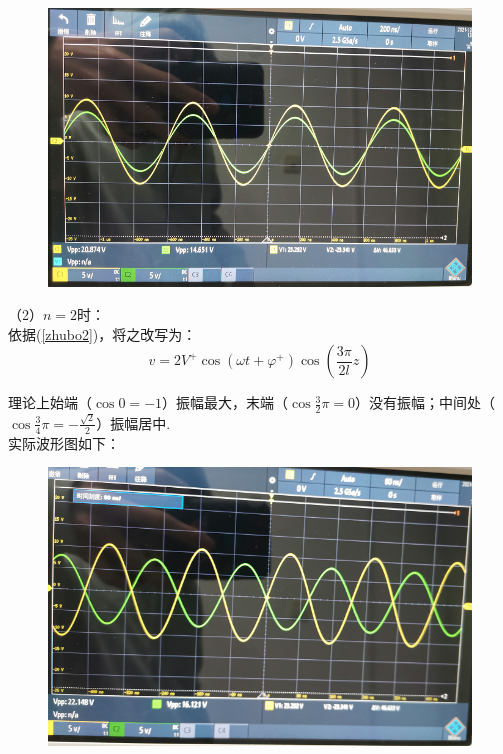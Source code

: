 \documentclass[UTF8]{ctexart}
\begin{document}
\begin{figure}[H]\begin{center}
    \includegraphics[scale=0.7]{23.PNG}
\end{center}\end{figure}

（2）$n=2$时：\\

依据(\ref{zhubo2})，将之改写为：
\begin{equation}
    v=2V^+\cos(\omega t+\varphi^+)\cos(\frac{3\pi}{2l}z)
    \label{n=2'}
\end{equation}\par
理论上始端（$\cos{0}=-1$）振幅最大，末端（$\cos{\frac{3}{2}\pi}=0$）没有振幅；中间处（$\cos{\frac{3}{4}\pi}=-\frac{\sqrt{2}}{2}$）振幅居中.\\
实际波形图如下：

\begin{figure}[H]\begin{center}
    \includegraphics[scale=0.7]{24.PNG}
\end{center}\end{figure}
\end{document}
